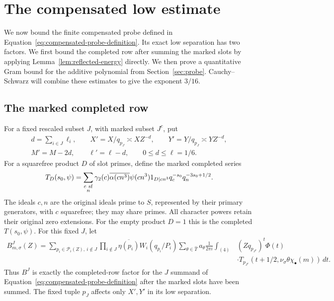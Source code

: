 \section{The compensated low estimate}\label{sec:compensated-low}

We now bound the finite compensated probe defined in
Equation~\eqref{eq:compensated-probe-definition}.  Its exact low separation
has two factors.  We first bound the completed row after summing the marked
slots by applying Lemma~\ref{lem:reflected-energy} directly.  We then prove
a quantitative Gram bound for the additive polynomial from
Section~\ref{sec:probe}.  Cauchy--Schwarz will combine these estimates to
give the exponent $3/16$.

\subsection{The marked completed row}

For a fixed rescaled subset $J$, with marked subset $J^c$, put
\begin{equation}
 \begin{gathered}
 d=\sum_{i\in J}\ell_i,\qquad
 X'=X/q_{p_J}\asymp XZ^{-d},\qquad
 Y'=Y/q_{p_J}\asymp YZ^{-d},\\
 M'=M-2d,\qquad \ell'=\ell-d,\qquad 0\le d\le\ell=1/6.
 \end{gathered}
 \label{old-eq:5.2}
\end{equation}
For a squarefree product $D$ of slot primes, define the marked completed
series
\[
 T_D(s_0,\psi)=\sum_{\substack{c\ {\rm sf}\\n}}
 \gamma_2(c)\overline{\alpha(cn^3)}\psi(cn^3)
 1_{D\mid cn^3}q_c^{-s_0}q_n^{-3s_0+1/2}.
\]
The ideals $c,n$ are the original ideals prime to $S$, represented by their
primary generators, with $c$ squarefree;
they may share primes.  All character powers retain their original zero
extensions.  For the empty product $D=1$ this is the completed $T(s_0,\psi)$.
For this fixed $J$, let
\[
\begin{split}
 B^J_{m,\sigma}(Z)=
 \sum_{p_i\in\mathcal P_i(Z),\ i\notin J}
 \prod_{i\notin J}\overline{\eta(p_i)}W_i(q_{p_i}/P_i)
 \sum_{\theta\in\widehat T}a_\theta\frac1{2\pi i}
 \int_{(4)} &(Zq_{p_{J^c}})^t\Phi(t)\\
 &\cdot T_{p_{J^c}}(t+1/2,
             \nu_\sigma\theta\chi_\bullet(m))\,dt.
\end{split}
\]
Thus $B^J$ is exactly the completed-row factor for the $J$ summand
of Equation~\eqref{eq:compensated-probe-definition} after the
marked slots have been summed.  The fixed tuple $p_J$ affects
only $X',Y'$ in its low separation.


